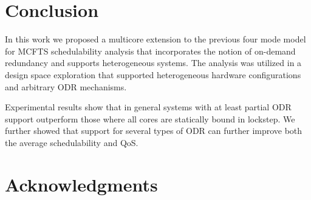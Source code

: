 \documentclass[conference]{IEEEtran}
\begin{document}
\section{Conclusion}
\label{sec:conclusion}

In this work we proposed a multicore extension to the previous four mode model for MCFTS schedulability analysis that incorporates the notion of on-demand redundancy and supports heterogeneous systems. The analysis was utilized in a design space exploration that supported heterogeneous hardware configurations and arbitrary ODR mechanisms. 

Experimental results show that in general systems with at least partial ODR support outperform those where all cores are statically bound in lockstep. We further showed that support for several types of ODR can further improve both the average schedulability and QoS.

\section*{Acknowledgments}

\end{document}
